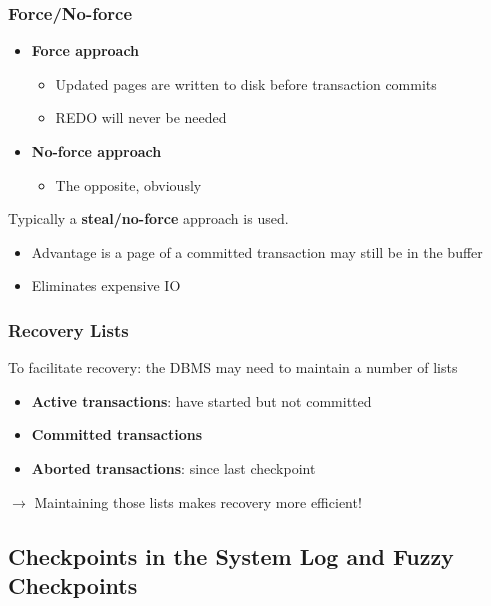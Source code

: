 \subsubsection{Force/No-force}
\begin{itemize}
	\item \textbf{Force approach}
	\begin{itemize}
		\item Updated pages are written to disk before transaction commits
		\item REDO will never be needed
	\end{itemize}
	\item \textbf{No-force approach}
	\begin{itemize}
		\item The opposite, obviously
	\end{itemize}
\end{itemize}
Typically a \textbf{steal/no-force} approach is used.
\begin{itemize}
	\item Advantage is a page of a committed transaction may still be in the buffer
	\item Eliminates expensive IO
\end{itemize}
\subsubsection{Recovery Lists}
To facilitate recovery: the DBMS may need to maintain a number of lists
\begin{itemize}
	\item \textbf{Active transactions}: have started but not committed
	\item \textbf{Committed transactions}
	\item \textbf{Aborted transactions}: since last checkpoint
\end{itemize}
$\rightarrow$ Maintaining those lists makes recovery more efficient!
\subsection{Checkpoints in the System Log and Fuzzy Checkpoints}
